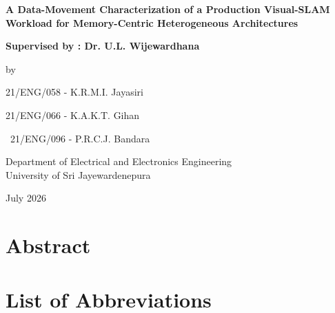 \documentclass[12pt,a4paper,oneside]{report}
\newcommand{\thesistitle}{A Data-Movement Characterization of a Production Visual-SLAM Workload for Memory-Centric Heterogeneous Architectures}
\newcommand{\thesisdept}{Department of Electrical and Electronics Engineering} %
\newcommand{\thesisuniv}{University of Sri Jayewardenepura} %
\newcommand{\thesisdate}{July 2026}
\begin{document}

\begin{titlepage}
\centering
\vspace*{1.5cm}
{\LARGE\bfseries \thesistitle\par}
\vspace{3.5cm}
\vspace{2.5cm}
{\Large\bfseries Supervised by : Dr. U.L. Wijewardhana\par}
\vspace{1cm}
{\large by\par}
\vspace{0.5cm}
{\large 21/ENG/058 - K.R.M.I. Jayasiri\par}
\vspace{0.3cm}
{\large 21/ENG/066 - K.A.K.T. Gihan\par}
\vspace{0.3cm}
{\large\ 21/ENG/096 - P.R.C.J. Bandara \par}
\vspace{0.3cm}
{\large \thesisdept\\ \thesisuniv\par}
\vspace{1.2cm}
{\large \thesisdate\par}
\vfill
\end{titlepage}

\chapter*{Abstract}


\tableofcontents
\listoffigures
{}
\listoftables
{}

\chapter*{List of Abbreviations}


\cleardoublepage
{}
\end{document}
